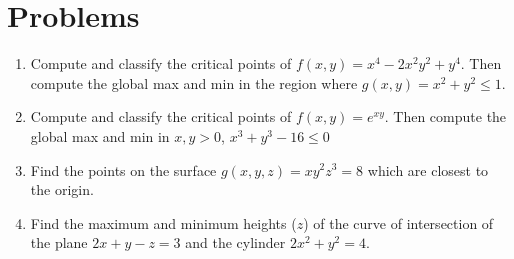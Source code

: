 \documentclass[letterpaper,11pt]{article}
\begin{document}
\section*{Problems}
\begin{enumerate}
\item Compute and classify the critical points of $f(x, y) = x^4 - 2 x^2 y^2 + y^4$.
  Then compute the global max and min in the region where $g(x, y) = x^2 + y^2 \leq 1$.
  \newpage
\item Compute and classify the critical points of $f(x, y) = e^{x y}$.
  Then compute the global max and min in $x, y > 0$, $x^3 + y^3 - 16 \leq 0$
  \newline
  \newline
  \newline
  \newline
  \newline
  \newline
  \newline
  \newline
  \newline
  \newline
  \newline
  \newline
  \newline
\item Find the points on the surface $g(x, y, z) = x y^2 z^3 = 8$ which are closest to the origin.
  \newline
  \newline
  \newline
  \newline
  \newline
  \newline
  \newline
  \newline
  \newline
  \newline
  \newline
  \newline
  \newline
\item Find the maximum and minimum heights ($z$) of the curve of intersection of the plane $2 x + y - z = 3$ and the cylinder $2 x^2 + y^2 = 4$.
\end{enumerate}
\end{document}
